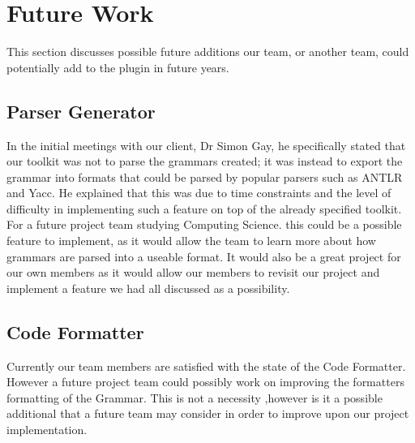 \section{Future Work}
This section discusses possible future additions our team, or another team, could potentially add to the plugin in future years. 

\subsection{Parser Generator}
In the initial meetings with our client, Dr Simon Gay, he specifically stated that our toolkit was not to parse the grammars created; it was instead to export the grammar into formats that could be parsed by popular parsers such as ANTLR and Yacc. He explained that this was due to time constraints and the level of difficulty in implementing such a feature on top of the already specified toolkit. For a future project team studying Computing Science. this could be a possible feature to implement, as it would allow the team to learn more about how grammars are parsed into a useable format. It would also be a great project for our own members as it would allow our members to revisit our project and implement a feature we had all discussed as a possibility. 

\subsection{Code Formatter}
Currently our team members are satisfied with the state of the Code Formatter. However a future project team could possibly work on improving the formatters formatting of the Grammar. This is not a necessity ,however is it a possible additional that a future team may consider in order to improve upon our project implementation. 
